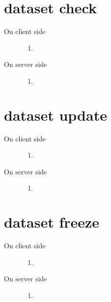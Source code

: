 \documentclass{scrreprt}
\begin{document}
\section{dataset check} 
\begin{description}

%
\item[On client side] \hfill
\begin{enumerate} 
\item

\end{enumerate}
%
\item[On server side] \hfill
\begin{enumerate} 
\item

\end{enumerate}

\end{description}



\section{dataset update} 
\begin{description}

%
\item[On client side] \hfill
\begin{enumerate} 
\item

\end{enumerate}
%
\item[On server side] \hfill
\begin{enumerate} 
\item

\end{enumerate}

\end{description}



\section{dataset freeze} 
\begin{description}

%
\item[On client side] \hfill
\begin{enumerate} 
\item

\end{enumerate}
%
\item[On server side] \hfill
\begin{enumerate} 
\item

\end{enumerate}

\end{description}
\end{document}

